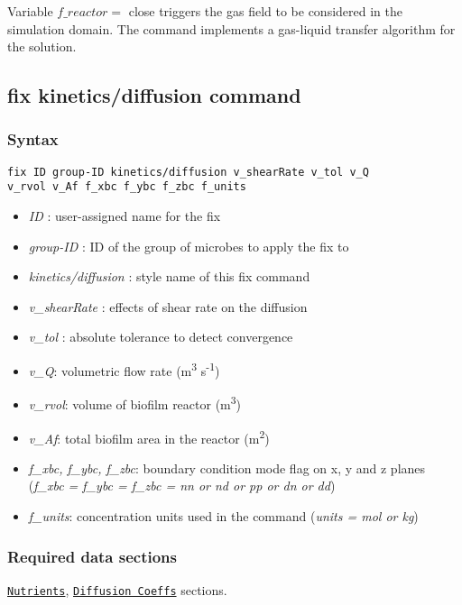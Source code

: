 \documentclass[11pt,a4paper,openright]{article}
\begin{document}
Variable $f\_reactor = $ close triggers the gas field to be considered in the simulation domain. The command implements a gas-liquid transfer algorithm for the solution.

\newpage
\subsection{fix kinetics/diffusion command}
\label{fkineticsdiffusion}

\subsubsection*{Syntax}

\begin{Verbatim}[frame=single]
fix ID group-ID kinetics/diffusion v_shearRate v_tol v_Q 
v_rvol v_Af f_xbc f_ybc f_zbc f_units
\end{Verbatim}

\begin{itemize} [nosep]
\item
	{\it ID }: user-assigned name for the fix
\item
	{\it group-ID }: ID of the group of microbes to apply the fix to
\item
	{\it kinetics/diffusion }: style name of this fix command
\item
	{\it v\_shearRate }: effects of shear rate on the diffusion
\item
	{\it v\_tol }: absolute tolerance to detect convergence
\item
    {\it v\_Q}: volumetric flow rate (m\textsuperscript{3} s\textsuperscript{-1})
\item
    {\it v\_rvol}: volume of biofilm reactor (m\textsuperscript{3})
\item
    {\it v\_Af}: total biofilm area in the reactor (m\textsuperscript{2})
\item
    {\it f\_xbc, f\_ybc, f\_zbc}: boundary condition mode flag on x, y and z planes ({\it f\_xbc = f\_ybc = f\_zbc = nn or nd or pp or dn or dd})
\item
    {\it f\_units}: concentration units used in the command ({\it units = mol or kg})
    
\end{itemize}

\subsubsection*{Required data sections} 
\hyperref[snutrients]{\tt Nutrients}, 
\hyperref[sdiffusion]{\tt Diffusion Coeffs} sections. 
\\
\end{document}

